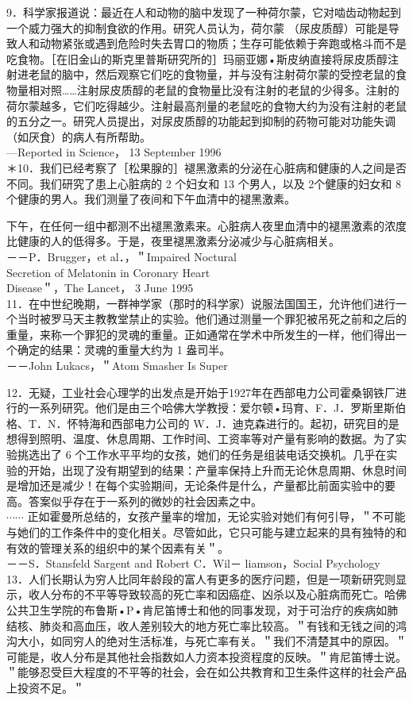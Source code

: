 9．科学家报道说：最近在人和动物的脑中发现了一种荷尔蒙，它对啮齿动物起到一个威力强大的抑制食欲的作用。研究人员认为，荷尔蒙 （尿皮质醇）可能是导致人和动物紧张或遇到危险时失去胃口的物质；生存可能依赖于奔跑或格斗而不是吃食物。［在旧金山的斯克里普斯研究所的］玛丽亚娜•斯皮纳直接将尿皮质醇注射进老鼠的脑中，然后观察它们吃的食物量，并与没有注射荷尔蒙的受控老鼠的食物量相对照……注射尿皮质醇的老鼠的食物量比没有注射的老鼠的少得多。注射的荷尔蒙越多，它们吃得越少。注射最高剂量的老鼠吃的食物大约为没有注射的老鼠的五分之一。研究人员提出，对尿皮质醇的功能起到抑制的药物可能对功能失调（如厌食）的病人有所帮助。\\
—Reported in Science， 13 September 1996\\
＊10．我们已经考察了［松果腺的］褪黑激素的分泌在心脏病和健康的人之间是否不同。我们研究了患上心脏病的 2 个妇女和 13 个男人，以及 2个健康的妇女和 8 个健康的男人。我们测量了夜间和下午血清中的褪黑激素。

下午，在任何一组中都测不出褪黑激素来。心脏病人夜里血清中的褪黑激素的浓度比健康的人的低得多。于是，夜里褪黑激素分泌减少与心脏病相关。\\
－－P．Brugger，et al．，＂Impaired Noctural\\
Secretion of Melatonin in Coronary Heart\\
Disease＂，The Lancet， 3 June 1995\\
11．在中世纪晚期，一群神学家（那时的科学家）说服法国国王，允许他们进行一个当时被罗马天主教教堂禁止的实验。他们通过测量一个罪犯被吊死之前和之后的重量，来称一个罪犯的灵魂的重量。正如通常在学术中所发生的一样，他们得出一个确定的结果：灵魂的重量大约为 1 盎司半。\\
－－John Lukacs，＂Atom Smasher Is Super

12．无疑，工业社会心理学的出发点是开始于1927年在西部电力公司霍桑钢铁厂进行的一系列研究。他们是由三个哈佛大学教授：爱尔顿•玛育、F．J．罗斯里斯伯格、T．N．怀特海和西部电力公司的 W．J．迪克森进行的。起初，研究目的是想得到照明、温度、休息周期、工作时间、工资率等对产量有影响的数据。为了实验挑选出了 6 个工作水平平均的女孩，她们的任务是组装电话交换机。几乎在实验的开始，出现了没有期望到的结果：产量率保持上升而无论休息周期、休息时间是增加还是减少！在每个实验期间，无论条件是什么，产量都比前面实验中的要高。答案似乎存在于一系列的微妙的社会因素之中。\\
$\cdots \cdots$ 正如霍曼所总结的，女孩产量率的增加，无论实验对她们有何引导，＂不可能与她们的工作条件中的变化相关。尽管如此，它只可能与建立起来的具有独特的和有效的管理关系的组织中的某个因素有关＂。\\
－－S．Stansfeld Sargent and Robert C．Wil－ liamson，Social Psychology\\
13．人们长期认为穷人比同年龄段的富人有更多的医疗问题，但是一项新研究则显示，收人分布的不平等导致较高的死亡率和因癌症、凶杀以及心脏病而死亡。哈佛公共卫生学院的布鲁斯•P•肯尼笛博士和他的同事发现，对于可治疗的疾病如肺结核、肺炎和高血压，收人差别较大的地方死亡率比较高。＂有钱和无钱之间的鸿沟大小，如同穷人的绝对生活标准，与死亡率有关。＂我们不清楚其中的原因。＂可能是，收人分布是其他社会指数如人力资本投资程度的反映。＂肯尼笛博士说。＂能够忍受巨大程度的不平等的社会，会在如公共教育和卫生条件这样的社会产品上投资不足。＂

